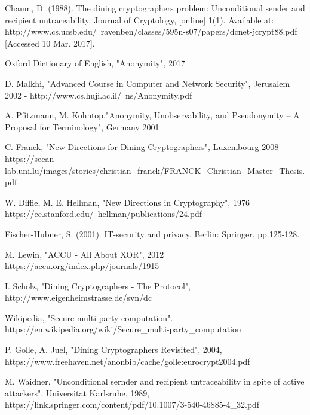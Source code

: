 \documentclass[12pt]{informatics-report}
\begin{document}


\begin{thebibliography}{99}

 Chaum, D. (1988). The dining cryptographers problem: Unconditional sender and recipient untraceability. Journal of Cryptology, [online] 1(1). Available at: http://www.cs.ucsb.edu/~ravenben/classes/595n-s07/papers/dcnet-jcrypt88.pdf [Accessed 10 Mar. 2017].

 Oxford Dictionary of English, "Anonymity", 2017

 D. Malkhi, "Advanced Course in Computer and Network Security", Jerusalem 2002 - http://www.cs.huji.ac.il/~ns/Anonymity.pdf

 A. Pfitzmann, M. Kohntop,"Anonymity, Unobservability, and Pseudonymity – A Proposal for Terminology", Germany 2001

 C. Franck, "New Directions for Dining Cryptographers", Luxembourg 2008 - https://secan-lab.uni.lu/images/stories/christian{\_}franck/FRANCK{\_}Christian{\_}Master{\_}Thesis.pdf

 W. Diffie, M. E. Hellman, "New Directions in Cryptography", 1976 https://ee.stanford.edu/~hellman/publications/24.pdf

 Fischer-Hubner, S. (2001). IT-security and privacy. Berlin: Springer, pp.125-128.

 M. Lewin, "ACCU - All About XOR", 2012 https://accu.org/index.php/journals/1915

 I. Scholz, "Dining Cryptographers - The Protocol", http://www.eigenheimstrasse.de/svn/dc

 Wikipedia, "Secure multi-party computation". https://en.wikipedia.org/wiki/Secure{\_}multi-party{\_}computation

 P. Golle, A. Juel, "Dining Cryptographers Revisited", 2004, https://www.freehaven.net/anonbib/cache/golle:eurocrypt2004.pdf 

 M. Waidner, "Unconditional sernder and recipient untraceability in spite of active attackers", Universitat Karlsruhe, 1989, https://link.springer.com/content/pdf/10.1007/3-540-46885-4{\_}32.pdf


\end{thebibliography}



\appendix


\end{document}
